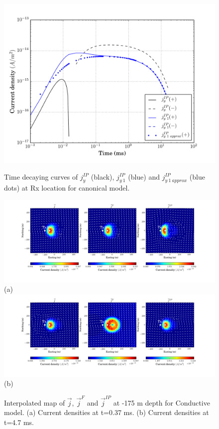 \documentclass[a4paper, 11pt]{article}
\renewcommand {\j}  { {\vec j} }
\begin{document}
\begin{figure}[htb]
  \centering
  \includegraphics[height=0.4\textheight]{figures/synthetic/CurrentIP_decay_case1_1.png} \\
  \caption{Time decaying curves of $j_y^{IP}$ (black), $j_{y \ 1}^{IP}$ (blue) and $j_{y \ 1 \ approx}^{IP}$ (blue dots) at Rx location for canonical model. }
  \label{F: currentIP_case1_decay}
\end{figure}
\clearpage
\begin{figure}[htb]
  \centering
  \includegraphics[height=0.25\textheight]{figures/synthetic/CurrentEMIP_case2_ch20.png} \\
  (a) \\
  \includegraphics[height=0.25\textheight]{figures/synthetic/CurrentEMIP_case2_ch38.png} \\
  (b)
  \caption{Interpolated map of $\j$, $\j^F$ and $\j^{IP}$ at -175 m depth for Conductive     model. (a) Current densities at t=0.37 ms. (b)  Current densities at t=4.7 ms. }
  \label{F: currentEMIP_case2_plan}
\end{figure}
\end{document}
